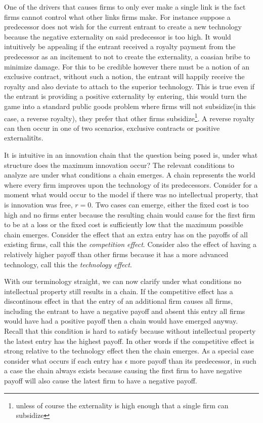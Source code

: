 \documentclass{article}
\begin{document}
One of the drivers that causes firms to only ever make a single link is the fact firms cannot control what other links firms make. For instance suppose a predecessor does not wish for the current entrant to create a new technology because the negative externality on said predecessor is too high. It would intuitively be appealing if the entrant received a royalty payment from the predecessor as an incitement to not to create the externality, a coasian bribe to minimize damage. For this to be credible however there must be a notion of an exclusive contract, without such a notion, the entrant will happily receive the royalty and also deviate to attach to the superior technology. This is true even if the entrant is providing a positive externality by entering, this would turn the game into a standard public goods problem where firms will not subsidize(in this case, a reverse royalty), they prefer that other firms subsidize\footnote{unless of course the externality is high enough that a single firm can subsidize}. A reverse royalty can then occur in one of two scenarios, exclusive contracts or positive externalitîts. 

It is intuitive in an innovation chain that the question being posed is, under what structure does the maximum innovation occur? The relevant conditions to analyze are under what conditions a chain emerges. A chain represents the world where every firm improves upon the technology of its predecessors. Consider for a moment what would occur to the model if there was no intellectual property, that is innovation was free, $r=0$. Two cases can emerge, either the fixed cost is too high and no firms enter because the resulting chain would cause for the first firm to be at a loss or the fixed cost is sufficiently low that the maximum possible chain emerges. Consider the effect that an extra entry has on the payoffs of all existing firms, call this the \textit{competition effect}. Consider also the effect of having a relatively higher payoff than other firms because it has a more advanced technology, call this the \textit{technology effect}. 

With our terminology straight, we can now clarify under what conditions no intellectual property still results in a chain. If the competitive effect has a discontinous effect in that the entry of an additional firm causes all firms, including the entrant to have a negative payoff and absent this entry all firms would have had a positive payoff then a chain would have emerged anyway. Recall that this condition is hard to satisfy because without intellectual property the latest entry has the highest payoff. In other words if the competitive effect is strong relative to the technology effect then the chain emerges. As a special case consider what occurs if each entry has $\epsilon$ more payoff than its predecessor, in such a case the chain always exists because causing the first firm to have negative payoff will also cause the latest firm to have a negative payoff. 
\end{document}
